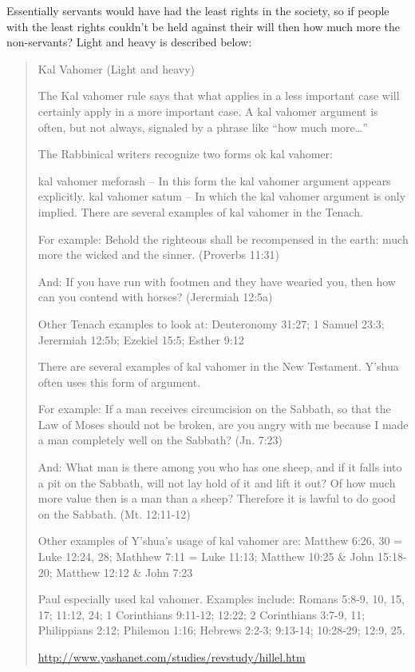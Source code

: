 \documentclass[11pt]{article}
\begin{document}
Essentially servants would have had the least rights in the society, so if people with the least rights couldn’t be held against their will then how much more the non-servants? Light and heavy is described below:
\begin{quote}
Kal Vahomer (Light and heavy)

The Kal vahomer rule says that what applies in a less important case will certainly apply in a more important case. A kal vahomer argument is often, but not always, signaled by a phrase like “how much more…”

The Rabbinical writers recognize two forms ok kal vahomer:

kal vahomer meforash – In this form the kal vahomer argument appears explicitly.
kal vahomer satum – In which the kal vahomer argument is only implied.
There are several examples of kal vahomer in the Tenach.

For example: Behold the righteous shall be recompensed in the earth: much more the wicked and the sinner. (Proverbs 11:31)

And: If you have run with footmen and they have wearied you, then how can you contend with horses? (Jerermiah 12:5a)

Other Tenach examples to look at: Deuteronomy 31:27; 1 Samuel 23:3; Jerermiah 12:5b; Ezekiel 15:5; Esther 9:12

There are several examples of kal vahomer in the New Testament. Y’shua often uses this form of argument.

For example: If a man receives circumcision on the Sabbath, so that the Law of Moses should not be broken, are you angry with me because I made a man completely well on the Sabbath? (Jn. 7:23)

And: What man is there among you who has one sheep, and if it falls into a pit on the Sabbath, will not lay hold of it and lift it out? Of how much more value then is a man than a sheep? Therefore it is lawful to do good on the Sabbath. (Mt. 12:11-12)

Other examples of Y'shua's usage of kal vahomer are:
Matthew 6:26, 30 = Luke 12:24, 28; Mathhew 7:11 = Luke 11:13; Matthew 10:25 \& John 15:18-20; Matthew 12:12 \& John 7:23

Paul especially used kal vahomer. Examples include: Romans 5:8-9, 10, 15, 17; 11:12, 24; 1 Corinthians 9:11-12; 12:22; 2 Corinthians 3:7-9, 11; Philippians 2:12; Philemon 1:16; Hebrews 2:2-3; 9:13-14; 10:28-29; 12:9, 25.

\url{http://www.yashanet.com/studies/revstudy/hillel.htm}
\end{quote}
\end{document}
